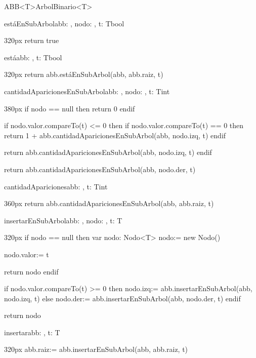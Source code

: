 \documentclass[10pt,a4paper]{article}
\begin{document}
\begin{ModuloImplements}{ABB<T>}{ArbolBinario<T>}
\begin{proc}{estáEnSubArbol}{\In abb: , \In nodo: , \In t: T}{bool}
\begin{ImplementationCode}{320px}
      return true
    \end{ImplementationCode}
  \end{proc}
  \begin{proc}{está}{\In abb: , \In t: T}{bool}
    \begin{ImplementationCode}{320px}
      return abb.estáEnSubArbol(abb, abb.raiz, t)
    \end{ImplementationCode}
  \end{proc}
  \vspace{2em}
  \begin{proc}{cantidadAparicionesEnSubArbol}{\In abb: , \In nodo: , \In t: T}{int}
    \begin{ImplementationCode}{380px}
      if nodo == null then
        return 0
      endif

      if nodo.valor.compareTo(t) <= 0 then
        if nodo.valor.compareTo(t) == 0 then
          return 1 + abb.cantidadAparicionesEnSubArbol(abb, nodo.izq, t)
        endif

        return abb.cantidadAparicionesEnSubArbol(abb, nodo.izq, t)
      endif

      return abb.cantidadAparicionesEnSubArbol(abb, nodo.der, t)
    \end{ImplementationCode}
  \end{proc}
  \begin{proc}{cantidadApariciones}{\In abb: , \In t: T}{int}
    \begin{ImplementationCode}{360px}
      return abb.cantidadAparicionesEnSubArbol(abb, abb.raiz, t)
    \end{ImplementationCode}
  \end{proc}
  \vspace{2em}
  \begin{proc}{insertarEnSubArbol}{\Inout abb: , \In nodo: , \In t: T}{}
    \begin{ImplementationCode}{320px}
      if nodo == null then
        var nodo: Nodo<T>
            nodo:= new Nodo()
        
        nodo.valor:= t

        return nodo
      endif

      if nodo.valor.compareTo(t) >= 0 then
        nodo.izq:= abb.insertarEnSubArbol(abb, nodo.izq, t)
      else
        nodo.der:= abb.insertarEnSubArbol(abb, nodo.der, t)
      endif

      return nodo
    \end{ImplementationCode}
  \end{proc}
  \begin{proc}{insertar}{\Inout abb: , \In t: T}{}
    \begin{ImplementationCode}{320px}
      abb.raiz:= abb.insertarEnSubArbol(abb, abb.raiz, t)


\end{ImplementationCode}
\end{proc}
\end{ModuloImplements}
\end{document}
